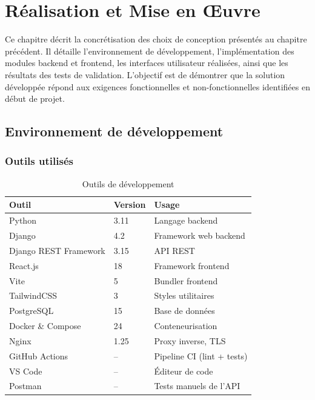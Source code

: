 \chapter{Réalisation et Mise en Œuvre}

\onehalfspacing

Ce chapitre décrit la concrétisation des choix de conception présentés au chapitre précédent. Il détaille l'environnement de développement, l'implémentation des modules backend et frontend, les interfaces utilisateur réalisées, ainsi que les résultats des tests de validation. L'objectif est de démontrer que la solution développée répond aux exigences fonctionnelles et non-fonctionnelles identifiées en début de projet.

\section{Environnement de développement}

\subsection{Outils utilisés}

\begin{table}[ht]
\centering
\caption{Outils de développement}
\label{tab:outils}
\begin{tabularx}{\textwidth}{|l|l|X|}
\hline
\textbf{Outil} & \textbf{Version} & \textbf{Usage} \\
\hline
Python & 3.11 & Langage backend \\
\hline
Django & 4.2 & Framework web backend \\
\hline
Django REST Framework & 3.15 & API REST \\
\hline
React.js & 18 & Framework frontend \\
\hline
Vite & 5 & Bundler frontend \\
\hline
TailwindCSS & 3 & Styles utilitaires \\
\hline
PostgreSQL & 15 & Base de données \\
\hline
Docker \& Compose & 24 & Conteneurisation \\
\hline
Nginx & 1.25 & Proxy inverse, TLS \\
\hline
GitHub Actions & -- & Pipeline CI (lint + tests) \\
\hline
VS Code & -- & Éditeur de code \\
\hline
Postman & -- & Tests manuels de l'API \\
\hline
\end{tabularx}
\end{table}

